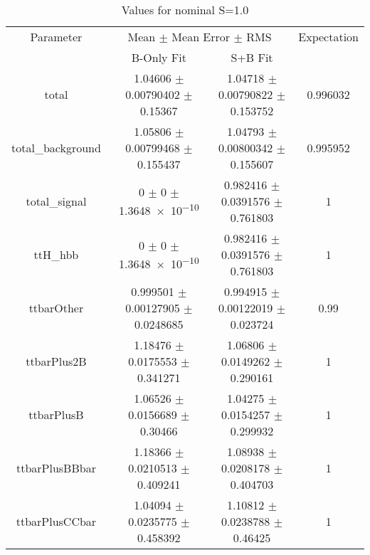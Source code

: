 \begin{table}
\centering
\caption{Values for nominal S=1.0}
\begin{tabular}{cccc}
\toprule
Parameter & \multicolumn{2}{c}{Mean $\pm$ Mean Error $\pm$ RMS} & Expectation\\
 & B-Only Fit & S+B Fit & \\
\midrule
total & \num{1.04606} $\pm$ \num{0.00790402} $\pm$ \num{0.15367} & \num{1.04718} $\pm$ \num{0.00790822} $\pm$ \num{0.153752} & \num{0.996032}\\
total\_background & \num{1.05806} $\pm$ \num{0.00799468} $\pm$ \num{0.155437} & \num{1.04793} $\pm$ \num{0.00800342} $\pm$ \num{0.155607} & \num{0.995952}\\
total\_signal & \num{0} $\pm$ \num{0} $\pm$ \num{1.3648e-10} & \num{0.982416} $\pm$ \num{0.0391576} $\pm$ \num{0.761803} & \num{1}\\
ttH\_hbb & \num{0} $\pm$ \num{0} $\pm$ \num{1.3648e-10} & \num{0.982416} $\pm$ \num{0.0391576} $\pm$ \num{0.761803} & \num{1}\\
ttbarOther & \num{0.999501} $\pm$ \num{0.00127905} $\pm$ \num{0.0248685} & \num{0.994915} $\pm$ \num{0.00122019} $\pm$ \num{0.023724} & \num{0.99}\\
ttbarPlus2B & \num{1.18476} $\pm$ \num{0.0175553} $\pm$ \num{0.341271} & \num{1.06806} $\pm$ \num{0.0149262} $\pm$ \num{0.290161} & \num{1}\\
ttbarPlusB & \num{1.06526} $\pm$ \num{0.0156689} $\pm$ \num{0.30466} & \num{1.04275} $\pm$ \num{0.0154257} $\pm$ \num{0.299932} & \num{1}\\
ttbarPlusBBbar & \num{1.18366} $\pm$ \num{0.0210513} $\pm$ \num{0.409241} & \num{1.08938} $\pm$ \num{0.0208178} $\pm$ \num{0.404703} & \num{1}\\
ttbarPlusCCbar & \num{1.04094} $\pm$ \num{0.0235775} $\pm$ \num{0.458392} & \num{1.10812} $\pm$ \num{0.0238788} $\pm$ \num{0.46425} & \num{1}\\
\bottomrule
\end{tabular}
\end{table}